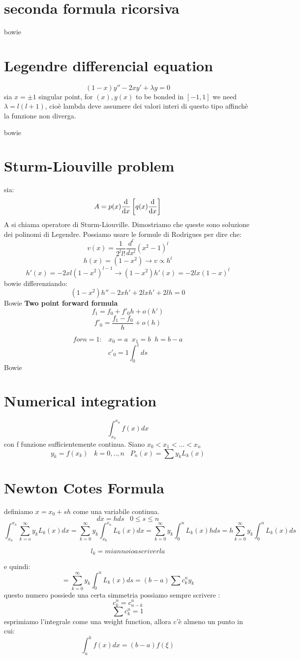\section{seconda formula ricorsiva}
bowie

\section{Legendre differencial equation}
\[(1-x)y''-2xy'+\lambda y=0\]
sia $x=\pm 1$ singular point, for $(x),y(x)$ to be bonded in $[-1,1]$ we need $\lambda=l(l+1)$, cioè lambda deve assumere dei valori interi di questo tipo affinchè la funzione non diverga.

bowie

\section{Sturm-Liouville problem}
sia:
\[A=p(x)\dv{x} \left[q(x)\dv{x}\right]\]
A si chiama operatore di Sturm-Liouville. Dimostriamo che queste sono soluzione dei polinomi di Legendre. Possiamo usare le formule di Rodrigues per dire che:
\[v(x)=\frac{1}{2^l l!}\frac{d^l}{dx^l}(x^2-1)^l\]
\[h(x)=(1-x^2) \rightarrow v \propto h^l\]
\[h'(x)=-2xl(1-x^2)^{l-1} \rightarrow (1-x^2)h'(x)=-2lx(1-x)^l\]
bowie
differenziando:
\[(1-x^2)h''-2xh'+2lxh'+2lh=0\]
Bowie
\textbf{Two point forward formula}
\[f_1=f_0+f'_0h+o(h')\]
\[f'_0=\frac{f_1-f_0}{h}+o(h)\]

\[for n=1: \;\;\; x_0=a \;\; x_1=b \;\; h=b-a\]
\[c'_0=1 \int_{0}^{1} ds\]
Bowie

\section{Numerical integration}
\[\int_{x_0}^{x_n} f(x) dx\] con f funzione sufficientemente continua. 
Siano $x_0<x_1<...<x_n$
\[y_k=f(x_k) \;\;\; k=0,..,n \;\;\; P_n(x)=\sum y_k L_k(x)\]

\section{Newton Cotes Formula}
definiamo $x=x_0+sh$ come una variabile continua.
\[dx=hds \;\;\; 0\le s \le n\]
\[\int_{x_0}^{x_k}\sum_{k=o}^{\infty}y_kL_k(x)dx=\sum_{k=0}^{\infty}y_k\int_{x_0}^{x_n}L_k(x)dx=\sum_{k=0}^{\infty}y_k\int_{0}^{n}L_k(x)hds=h\sum_{k=0}^{\infty}y_k\int_{0}^{n}L_k(x)ds\]

\[l_k= mi annoio a scriverla\]

e quindi:
\[=\sum_{k=0}^{\infty}y_k\int_{0}^{n}L_k(x)ds=(b-a)\sum c_k^ny_k\]
questo numero possiede una certa simmetria possiamo sempre scrivere :
\[c_k^n=c^n_{n-k}\]
\[\sum c_k^n=1\]
 esprimiamo l'integrale come una weight function, allora c'è almeno un punto in cui:
 \[\int_{a}^{b} f(x)dx=(b-a)f(\xi)\]
